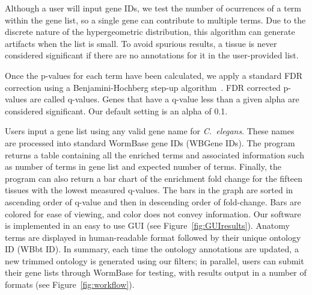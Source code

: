 \documentclass{bmcart}
\begin{document}
Although a user will input gene IDs, we test the number of ocurrences of a term within the gene list, so a single gene can contribute to multiple terms. Due to the discrete nature of the hypergeometric distribution, this algorithm can generate artifacts when the list is small. To avoid spurious results, a tissue is never considered significant if there are no annotations for it in the user-provided list.

Once the p-values for each term have been calculated, we apply a standard FDR correction using a Benjamini-Hochberg step-up algorithm~\cite{Benjamini1995}. FDR corrected p-values are called q-values. Genes that have a q-value less than a given alpha are considered significant. Our default setting is an alpha of 0.1. 

Users input a gene list using any valid gene name for \emph{C.~elegans}. These names are processed into standard WormBase gene IDs (WBGene IDs). The program returns a table containing all the enriched terms and associated  information such as number of terms in gene list and expected number of terms.%
 Finally, the program can also return a bar chart of the enrichment fold change for the fifteen tissues with the lowest measured q-values. The bars in the graph are sorted in ascending order of q-value and then in descending order of fold-change. Bars are colored for ease of viewing, and color does not convey information. Our software is implemented in an easy to use GUI (see Figure~\ref{fig:GUIresults}). Anatomy terms are displayed in human-readable format followed by their unique ontology ID (WBbt ID). In summary, each time the ontology annotations are updated, a new trimmed ontology is generated using our filters; in parallel, users can submit their gene lists through WormBase for testing, with results output in a number of formats (see Figure~\ref{fig:workflow}).
\end{document}
